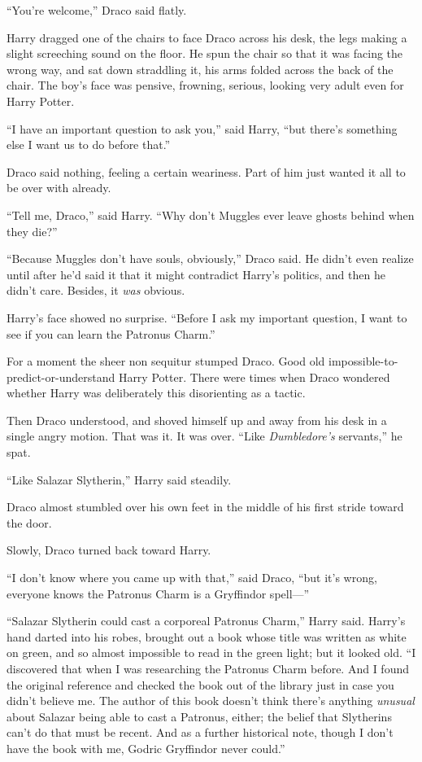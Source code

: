 “You’re welcome,” Draco said flatly.

Harry dragged one of the chairs to face Draco across his desk, the legs making a slight screeching sound on the floor. He spun the chair so that it was facing the wrong way, and sat down straddling it, his arms folded across the back of the chair. The boy’s face was pensive, frowning, serious, looking very adult even for Harry Potter.

“I have an important question to ask you,” said Harry, “but there’s something else I want us to do before that.”

Draco said nothing, feeling a certain weariness. Part of him just wanted it all to be over with already.

“Tell me, Draco,” said Harry. “Why don’t Muggles ever leave ghosts behind when they die?”

“Because Muggles don’t have souls, obviously,” Draco said. He didn’t even realize until after he’d said it that it might contradict Harry’s politics, and then he didn’t care. Besides, it \emph{was} obvious.

Harry’s face showed no surprise. “Before I ask my important question, I want to see if you can learn the Patronus Charm.”

For a moment the sheer non sequitur stumped Draco. Good old
impossible-to-predict-or-understand Harry Potter. There were times when Draco wondered whether Harry was deliberately this disorienting as a tactic.

Then Draco understood, and shoved himself up and away from his desk in a single angry motion. That was it. It was over. “Like \emph{Dumbledore’s} servants,” he spat.

“Like Salazar Slytherin,” Harry said steadily.

Draco almost stumbled over his own feet in the middle of his first stride toward the door.

Slowly, Draco turned back toward Harry.

“I don’t know where you came up with that,” said Draco, “but it’s wrong, everyone knows the Patronus Charm is a Gryffindor spell—”

“Salazar Slytherin could cast a corporeal Patronus Charm,” Harry said. Harry’s hand darted into his robes, brought out a book whose title was written as white on green, and so almost impossible to read in the green light; but it looked old. “I discovered that when I was researching the Patronus Charm before. And I found the original reference and checked the book out of the library just in case you didn’t believe me. The author of this book doesn’t think there’s anything \emph{unusual} about Salazar being able to cast a Patronus, either; the belief that Slytherins can’t do that must be recent. And as a further historical note, though I don’t have the book with me, Godric Gryffindor never could.”

